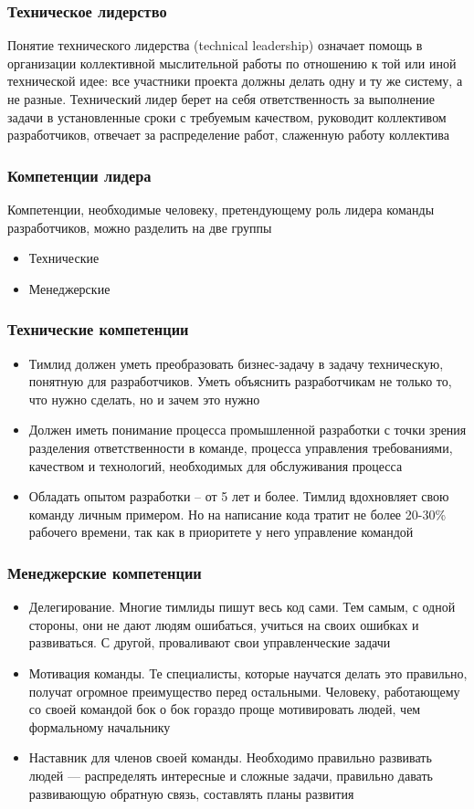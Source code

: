 \documentclass{../industrial-development}
\begin{document}
\lecturenotes

\begin{frame} \frametitle {Техническое лидерство}
Понятие технического лидерства (technical leadership) означает помощь в организации коллективной мыслительной работы по отношению к той или иной технической идее: все участники проекта должны делать одну и ту же систему, а не разные. Технический лидер берет на себя ответственность за выполнение задачи в установленные сроки с требуемым качеством, руководит коллективом разработчиков, отвечает за распределение работ, слаженную работу коллектива
\end{frame}

\begin{frame} \frametitle{Компетенции лидера}
Компетенции, необходимые человеку, претендующему роль лидера команды разработчиков, можно разделить на две группы
  \begin{itemize}
  \item Технические 
  \item Менеджерские 
  \end{itemize}
\end{frame}


\begin{frame} \frametitle{Технические компетенции}
 \begin{itemize}
  \item Тимлид должен уметь преобразовать бизнес-задачу в задачу техническую, понятную для разработчиков. Уметь объяснить разработчикам не только то, что нужно сделать, но и зачем это нужно 
  \item Должен иметь понимание процесса промышленной разработки с точки зрения разделения ответственности в команде, процесса управления требованиями, качеством и технологий, необходимых для обслуживания процесса 
  \item Обладать опытом разработки – от 5 лет и более. Тимлид вдохновляет свою команду личным примером. Но на написание кода тратит не более 20-30\% рабочего времени, так как в приоритете у него управление командой 
  \end{itemize}
\end{frame}
  
  
\begin{frame} \frametitle{Менеджерские компетенции}
 \begin{itemize}
\item Делегирование. Многие тимлиды пишут весь код сами. Тем самым, с одной стороны, они не дают людям ошибаться, учиться на своих ошибках и развиваться. С другой, проваливают свои управленческие задачи
\item Мотивация команды. Те специалисты, которые научатся делать это правильно, получат огромное преимущество перед остальными. Человеку, работающему со своей командой бок о бок гораздо проще мотивировать людей, чем формальному начальнику
\item Наставник для членов своей команды. Необходимо правильно развивать людей — распределять интересные и сложные задачи, правильно давать развивающую обратную связь, составлять планы развития
 \end{itemize}
\end{frame}
\end{document}
